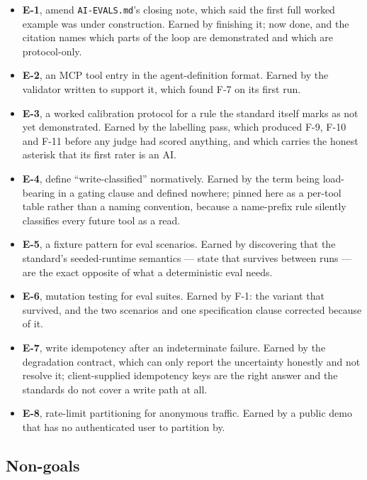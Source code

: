 \documentclass[11pt,a4paper]{article}
\begin{document}
\begin{itemize}[leftmargin=*]
    \item \textbf{E-1}, amend \texttt{AI-EVALS.md}'s closing note, which said the
    first full worked example was under construction. Earned by finishing it;
    now done, and the citation names which parts of the loop are demonstrated
    and which are protocol-only.
    \item \textbf{E-2}, an MCP tool entry in the agent-definition format. Earned
    by the validator written to support it, which found F-7 on its first run.
    \item \textbf{E-3}, a worked calibration protocol for a rule the standard
    itself marks as not yet demonstrated. Earned by the labelling pass, which
    produced F-9, F-10 and F-11 before any judge had scored anything, and which
    carries the honest asterisk that its first rater is an AI.
    \item \textbf{E-4}, define ``write-classified'' normatively. Earned by the
    term being load-bearing in a gating clause and defined nowhere; pinned here
    as a per-tool table rather than a naming convention, because a name-prefix
    rule silently classifies every future tool as a read.
    \item \textbf{E-5}, a fixture pattern for eval scenarios. Earned by
    discovering that the standard's seeded-runtime semantics --- state that
    survives between runs --- are the exact opposite of what a deterministic
    eval needs.
    \item \textbf{E-6}, mutation testing for eval suites. Earned by F-1: the
    variant that survived, and the two scenarios and one specification clause
    corrected because of it.
    \item \textbf{E-7}, write idempotency after an indeterminate failure. Earned
    by the degradation contract, which can only report the uncertainty honestly
    and not resolve it; client-supplied idempotency keys are the right answer and
    the standards do not cover a write path at all.
    \item \textbf{E-8}, rate-limit partitioning for anonymous traffic. Earned by
    a public demo that has no authenticated user to partition by.
\end{itemize}

\subsection{Non-goals}
\end{document}
